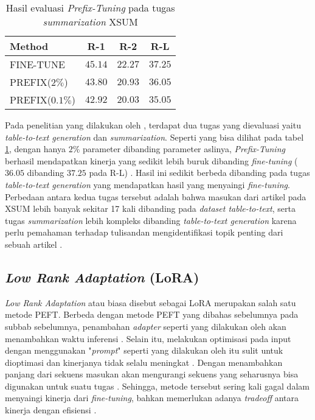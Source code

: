 \begin{table}[h]
    \vspace{0.25cm}
    \centering
    \caption{Hasil evaluasi \textit{Prefix-Tuning} pada tugas \textit{summarization} XSUM \parencite{prefix_tuning}}
    \label{table:prefix_tuning_result}
    \begin{tabular}{lccc}
        \toprule
        Method & R-1 & R-2 & R-L \\
        \midrule
        FINE-TUNE & $45.14$ & $22.27$ & $37.25$ \\
        PREFIX($2\%$) & $43.80$ & $20.93$ & $36.05$ \\
        PREFIX($0.1\%$) & $42.92$ & $20.03$ & $35.05$ \\
        \bottomrule
    \end{tabular}
\end{table}

Pada penelitian yang dilakukan oleh \citeauthor{prefix_tuning}, terdapat dua tugas yang dievaluasi yaitu \textit{table-to-text generation} dan \textit{summarization}. Seperti yang bisa dilihat pada tabel \ref{table:prefix_tuning_result}, dengan hanya $2\%$ parameter dibanding parameter aslinya, \textit{Prefix-Tuning} berhasil mendapatkan kinerja yang sedikit lebih buruk dibanding \textit{fine-tuning} ($36.05$ dibanding $37.25$ pada R-L) \parencite{prefix_tuning}. Hasil ini sedikit berbeda dibanding pada tugas \textit{table-to-text generation} yang mendapatkan hasil yang menyaingi \textit{fine-tuning}. Perbedaan antara kedua tugas tersebut adalah bahwa masukan dari artikel pada XSUM lebih banyak sekitar 17 kali dibanding pada \textit{dataset table-to-text}, serta tugas \textit{summarization} lebih kompleks dibanding \textit{table-to-text generation} karena perlu pemahaman terhadap tulisandan mengidentifikasi topik penting dari sebuah artikel \parencite{prefix_tuning}.

\subsection{\textit{Low Rank Adaptation} (LoRA)}

\textit{Low Rank Adaptation} atau biasa disebut sebagai LoRA merupakan salah satu metode PEFT. Berbeda dengan metode PEFT yang dibahas sebelumnya pada subbab sebelumnya, penambahan \textit{adapter} seperti yang dilakukan oleh \citeauthor{adapter_houlsby} akan menambahkan waktu inferensi \parencite{lora}. Selain itu, melakukan optimisasi pada input dengan menggunakan "\textit{prompt}" seperti yang dilakukan oleh \citeauthor{prefix_tuning} itu sulit untuk dioptimasi dan kinerjanya tidak selalu meningkat \parencite{lora}. Dengan menambahkan panjang dari sekuens masukan akan mengurangi sekuens yang seharusnya bisa digunakan untuk suatu tugas \parencite{lora}. Sehingga, metode tersebut sering kali gagal dalam menyaingi kinerja dari \textit{fine-tuning}, bahkan memerlukan adanya \textit{tradeoff} antara kinerja dengan efisiensi \parencite{lora}.

